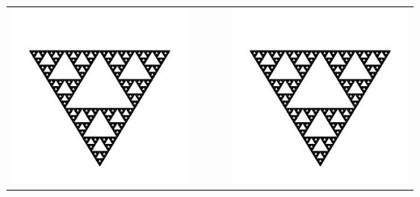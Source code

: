 \documentclass[letterpaper,12pt]{article}
\begin{document}
\begin{table}[h!]
\centering
\begin{tabular}{|ccccc|}\hline
\includegraphics[scale=0.32]{fractal} &  &  &  & \includegraphics[scale=0.35]{fractal}\\

\end{tabular}
\end{table}
\end{document}
